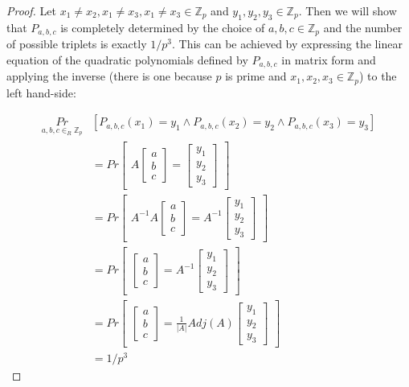 \documentclass[12pt, a4paper]{article} %
\theoremstyle{definition}
\newcommand{\Z}{\mathbb{Z}}
\begin{document}
\begin{proof}

  Let $x_1 \neq x_2, x_1 \neq x_3, x_1 \neq x_3 \in \Z_p$ and $y_1, y_2, y_3 \in \Z_p$. Then we will show that $P_{a,b,c}$ is completely determined by the choice of $a,b,c \in \Z_p$ and the number of possible triplets is exactly $1/p^3$. This can be achieved by expressing the linear equation of the quadratic polynomials defined by $P_{a,b,c}$ in matrix form and applying the inverse (there is one because $p$ is prime and $x_1, x_2, x_3 \in \Z_p$) to the left hand-side:

\begin{align*}
  \underset{a,b,c \in_R \Z_p}{Pr} & [ P_{a,b,c}(x_1) = y_1 \land P_{a,b,c}(x_2) = y_2 \land P_{a,b,c}(x_3) = y_3]\\
  & = Pr \begin{bmatrix}A\begin{bmatrix}a\\b\\c\end{bmatrix} = \begin{bmatrix}y_1\\y_2\\y_3\end{bmatrix}\end{bmatrix} \\
  & = Pr \begin{bmatrix}A^{-1}A\begin{bmatrix}a\\b\\c\end{bmatrix} = A^{-1}\begin{bmatrix}y_1\\y_2\\y_3\end{bmatrix}\end{bmatrix}\\
  & = Pr \begin{bmatrix}\begin{bmatrix}a\\b\\c\end{bmatrix} = A^{-1}\begin{bmatrix}y_1\\y_2\\y_3\end{bmatrix}\end{bmatrix}\\
  & = Pr \begin{bmatrix}\begin{bmatrix}a\\b\\c\end{bmatrix} = \frac{1}{|A|}Adj(A)\begin{bmatrix}y_1\\y_2\\y_3\end{bmatrix}\end{bmatrix}\\
  & = 1/p^3
\end{align*}


\end{proof}
\end{document}
